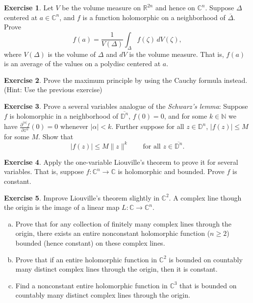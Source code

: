 \documentclass[12pt,openany]{book}
\newcommand{\sabs}[1]{\lvert {#1} \rvert}
\newcommand{\snorm}[1]{\lVert {#1} \rVert}
\newcommand{\C}{{\mathbb{C}}}
\newcommand{\R}{{\mathbb{R}}}
\newcommand{\N}{{\mathbb{N}}}
\newcommand{\D}{{\mathbb{D}}}
\newcommand{\myindex}[1]{#1\index{#1}}
\theoremstyle{plain}
\theoremstyle{remark}
\theoremstyle{definition}
\newenvironment{exbox}{%
    \def\FrameCommand{\vrule width 1pt \relax\hspace{10pt}}%
    \MakeFramed{\advance\hsize-\width\FrameRestore}%
}{%
    \endMakeFramed
}
\newenvironment{exparts}{%
    \leavevmode\begin{enumerate}[a),noitemsep,topsep=0pt,parsep=0pt,partopsep=0pt]
}{%
    \end{enumerate}
}
\theoremstyle{exercise}
\newtheorem{exercise}{Exercise}[section]
\theoremstyle{example}
\begin{document}
\begin{exbox}
\begin{exercise} \label{exercise:averageDelta}
Let $V$ be the volume measure on $\R^{2n}$ and hence on $\C^n$.
Suppose $\Delta$ centered at $a \in \C^n$, and $f$ is a function holomorphic on
a neighborhood of $\overline{\Delta}$.  Prove
\begin{equation*}
f(a) =
\frac{1}{V(\Delta)}
\int_{\Delta} f(\zeta) \, dV(\zeta) ,
\end{equation*}
where $V(\Delta)$ is the volume of $\Delta$ and $dV$ is the volume measure.
That is, $f(a)$ is an average of the values on a polydisc centered at $a$.
\end{exercise}

\begin{exercise}
Prove the maximum principle by using the Cauchy formula instead.  (Hint:
Use the previous exercise)
\end{exercise}

\begin{exercise}
Prove a several variables analogue of the \emph{\myindex{Schwarz's lemma}}:
Suppose $f$ is holomorphic in a neighborhood of $\overline{\D^n}$,
$f(0) = 0$, and for some $k \in \N$ we have
$\frac{\partial^{\sabs{\alpha}} f}{\partial z^\alpha} (0) =
0$ whenever $\sabs{\alpha} < k$.  Further suppose 
for all $z \in \D^n$,
$\sabs{f(z)} \leq M$ for some $M$.  Show that
\begin{equation*}
\sabs{f(z)} \leq M \snorm{z}^k
\qquad
\text{for all $z \in \overline{\D^n}$}.
\end{equation*}
\end{exercise}

\begin{exercise}
Apply the one-variable Liouville's theorem to prove it for several variables.
That is, suppose $f \colon \C^n \to \C$ is holomorphic and bounded.
Prove $f$ is constant.
\end{exercise}

\begin{exercise}
\pagebreak[2]
Improve Liouville's theorem slightly in $\C^2$.
A complex line though the origin is
the image of a linear map $L \colon \C \to \C^n$.
\begin{exparts}
\item
Prove that 
for any collection of finitely many complex lines through the origin,
there exists an entire nonconstant holomorphic function ($n \geq 2$)
bounded (hence constant) on these complex lines.
\item
Prove that if an entire holomorphic function in $\C^2$ is bounded on
countably many distinct
complex lines through the origin, then it is constant.
\item
Find a nonconstant entire holomorphic function in $\C^3$ that is
bounded on
countably many distinct
complex lines through the origin.
\end{exparts}
\end{exercise}


\end{exbox}
\end{document}
